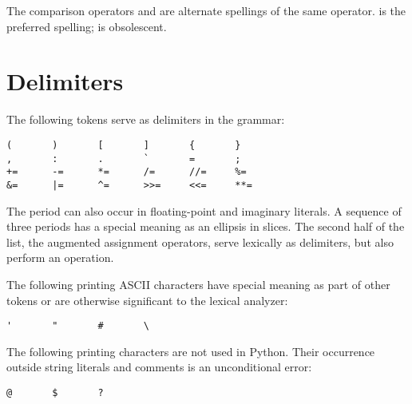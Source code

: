 The comparison operators \code{<>} and \code{!=} are alternate
spellings of the same operator.  \code{!=} is the preferred spelling;
\code{<>} is obsolescent.


\section{Delimiters\label{delimiters}}

The following tokens serve as delimiters in the grammar:

\begin{verbatim}
(       )       [       ]       {       }
,       :       .       `       =       ;
+=      -=      *=      /=      //=     %=
&=      |=      ^=      >>=     <<=     **=
\end{verbatim}

The period can also occur in floating-point and imaginary literals.  A
sequence of three periods has a special meaning as an ellipsis in slices.
The second half of the list, the augmented assignment operators, serve
lexically as delimiters, but also perform an operation.

The following printing ASCII characters have special meaning as part
of other tokens or are otherwise significant to the lexical analyzer:

\begin{verbatim}
'       "       #       \
\end{verbatim}

The following printing \ASCII{} characters are not used in Python.  Their
occurrence outside string literals and comments is an unconditional
error:

\begin{verbatim}
@       $       ?
\end{verbatim}
